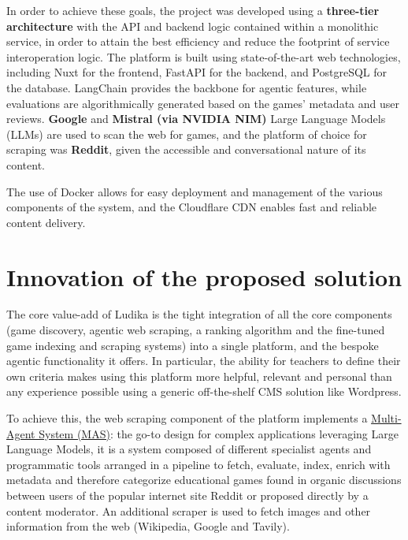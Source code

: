 \documentclass[11pt,italian,a4paper]{article}
\newcommand{\todo}[1]{\noindent {\Huge \color{orange} TODO -- #1}}
\begin{document}
In order to achieve these goals, the project was developed using a \textbf{three-tier architecture} with the API and backend logic contained within a monolithic service, in order to attain the best efficiency and reduce the footprint of service interoperation logic. The platform is built using state-of-the-art web technologies, including Nuxt for the frontend, FastAPI for the backend, and PostgreSQL for the database. LangChain provides the backbone for agentic features, while evaluations are algorithmically generated based on the games' metadata and user reviews. \textbf{Google} and \textbf{Mistral (via NVIDIA NIM)} Large Language Models (LLMs) are used to scan the web for games, and the platform of choice for scraping was \textbf{Reddit}, given the accessible and conversational nature of its content.

The use of Docker allows for easy deployment and management of the various components of the system, and the Cloudflare CDN enables fast and reliable content delivery.


\section{Innovation of the proposed solution}

The core value-add of Ludika is the tight integration of all the core components (game discovery, agentic web scraping, a ranking algorithm and the fine-tuned game indexing and scraping systems) into a single platform, and the bespoke agentic functionality it offers. In particular, the ability for teachers to define their own criteria makes using this platform more helpful, relevant and personal than any experience possible using a generic off-the-shelf CMS solution like Wordpress.

To achieve this, the web scraping component of the platform implements a \href{https://en.wikipedia.org/wiki/Multi-agent_system}{Multi-Agent System (MAS)}: the go-to design for complex applications leveraging Large Language Models, it is a system composed of different specialist agents and programmatic tools arranged in a pipeline to fetch, evaluate, index, enrich with metadata and therefore categorize educational games found in organic discussions between users of the popular internet site Reddit or proposed directly by a content moderator. An additional scraper is used to fetch images and other information from the web (Wikipedia, Google and Tavily).
\end{document}
